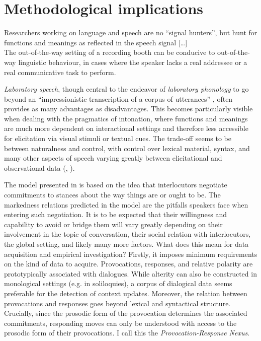 \section{Methodological implications}\label{ch:4.2}

\begin{displayquote}
Researchers working on language and speech are no ``signal hunters'', but hunt for functions and meanings as reflected in the speech signal [\ldots] \\
The out-of-the-way setting of a recording booth can be conducive to out-of-the-way linguistic behaviour, in cases where the speaker lacks a real addressee or a real communicative task to perform. \citep[3, 10]{NiebuhrMichaud.2015}
\end{displayquote}

\textit{Laboratory speech}, though central to the endeavor of \textit{laboratory phonology} to go beyond an ``impressionistic transcription of a corpus of utterances'' \citep[6]{CohnFougeronHuffman.2012intro}, often provides as many advantages as disadvantages. This becomes particularly visible when dealing with the pragmatics of intonation, where functions and meanings are much more dependent on interactional settings and therefore less accessible for elicitation via visual stimuli or textual cues. The trade-off seems to be between naturalness and control, with control over lexical material, syntax, and many other aspects of speech varying greatly between elicitational and observational data (\cite[217]{KasperDahl.1991}, \cite[192]{VanrellFeldhausenAstruc.2018}).\largerpage

The model presented in  is based on the idea that interlocutors negotiate commitments to stances about the way things are or ought to be. The markedness relations predicted in the model are the pitfalls speakers face when entering such negotiation. It is to be expected that their willingness and capability to avoid or bridge them will vary greatly depending on their involvement in the topic of conversation, their social relation with interlocutors, the global setting, and likely many more factors. What does this mean for data acquisition and empirical investigation? Firstly, it imposes minimum requirements on the kind of data to acquire. Provocations, responses, and relative polarity are prototypically associated with dialogues. While alterity can also be constructed in monological settings (e.g. in soliloquies), a corpus of dialogical data seems preferable for the detection of context updates. Moreover, the relation between provocations and responses goes beyond lexical and syntactical structure. Crucially, since the prosodic form of the provocation determines the associated commitments, responding moves can only be understood with access to the prosodic form of their provocations. I call this the \textit{Provocation-Response Nexus}.

